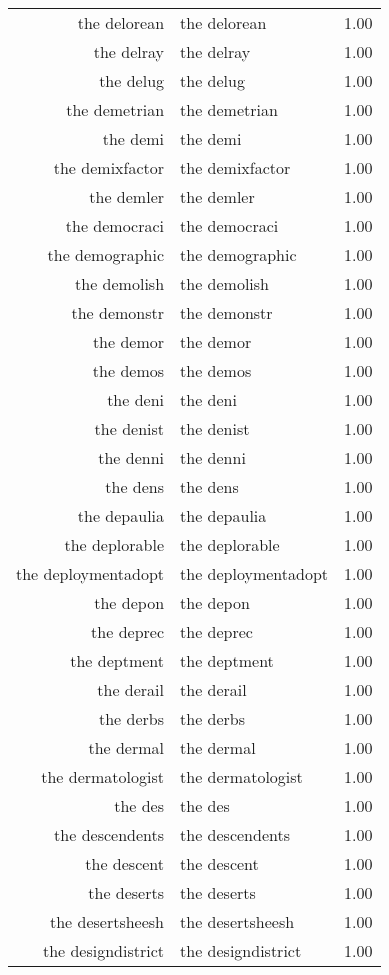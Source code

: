 \begin{table}[ht]
\begin{tabular}{rlr}
  the delorean & the delorean & 1.00 \\ 
  the delray & the delray & 1.00 \\ 
  the delug & the delug & 1.00 \\ 
  the demetrian & the demetrian & 1.00 \\ 
  the demi & the demi & 1.00 \\ 
  the demixfactor & the demixfactor & 1.00 \\ 
  the demler & the demler & 1.00 \\ 
  the democraci & the democraci & 1.00 \\ 
  the demographic & the demographic & 1.00 \\ 
  the demolish & the demolish & 1.00 \\ 
  the demonstr & the demonstr & 1.00 \\ 
  the demor & the demor & 1.00 \\ 
  the demos & the demos & 1.00 \\ 
  the deni & the deni & 1.00 \\ 
  the denist & the denist & 1.00 \\ 
  the denni & the denni & 1.00 \\ 
  the dens & the dens & 1.00 \\ 
  the depaulia & the depaulia & 1.00 \\ 
  the deplorable & the deplorable & 1.00 \\ 
  the deploymentadopt & the deploymentadopt & 1.00 \\ 
  the depon & the depon & 1.00 \\ 
  the deprec & the deprec & 1.00 \\ 
  the deptment & the deptment & 1.00 \\ 
  the derail & the derail & 1.00 \\ 
  the derbs & the derbs & 1.00 \\ 
  the dermal & the dermal & 1.00 \\ 
  the dermatologist & the dermatologist & 1.00 \\ 
  the des & the des & 1.00 \\ 
  the descendents & the descendents & 1.00 \\ 
  the descent & the descent & 1.00 \\ 
  the deserts & the deserts & 1.00 \\ 
  the desertsheesh & the desertsheesh & 1.00 \\ 
  the designdistrict & the designdistrict & 1.00 \\ 

\end{tabular}
\end{table}
